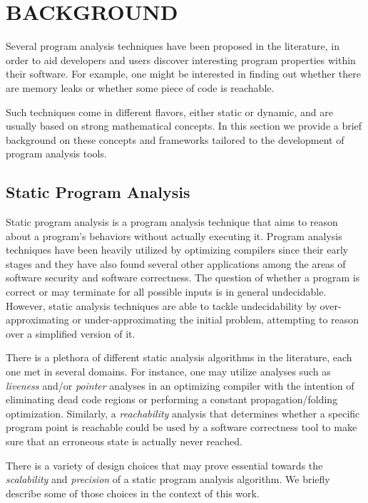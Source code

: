 \chapter{BACKGROUND}\label{c:background}

Several program analysis techniques have been proposed in the literature, in
order to aid developers and users discover interesting program properties within
their software. For example, one might be interested in finding out whether
there are memory leaks or whether some piece of code is reachable.

Such techniques come in different flavors, either static or dynamic, and are
usually based on strong mathematical concepts. In this section we provide
a brief background on these concepts and frameworks tailored to
the development of program analysis tools.

\section{Static Program Analysis}

Static program analysis is a program analysis technique that aims to reason
about a program's behaviors without actually executing it. Program analysis techniques have been
heavily utilized by optimizing compilers since their early stages and they
have also found several other applications among the areas of software security
and software correctness\cite{spa}. The question of whether
a program is correct or may terminate for all possible inputs is in general
undecidable. However, static analysis techniques are able to tackle
undecidability by over-approximating or under-approximating the initial problem,
attempting to reason over a simplified version of it.

There is a plethora of different static analysis algorithms in the literature, each one
met in several domains. For instance, one may utilize analyses such as \emph{liveness} and/or
\emph{pointer} analyses in an optimizing compiler with the intention of eliminating
dead code regions or performing a constant propagation/folding optimization.
Similarly, a \emph{reachability} analysis that determines whether a specific program point is
reachable could be used by a software correctness tool to make sure that
an erroneous state is actually never reached.

There is a variety of design choices that may prove essential towards the \emph{scalability}
and \emph{precision} of a static program analysis algorithm. We briefly describe some of
those choices in the context of this work.

